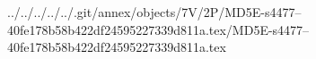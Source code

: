 ../../../../../.git/annex/objects/7V/2P/MD5E-s4477--40fe178b58b422df24595227339d811a.tex/MD5E-s4477--40fe178b58b422df24595227339d811a.tex